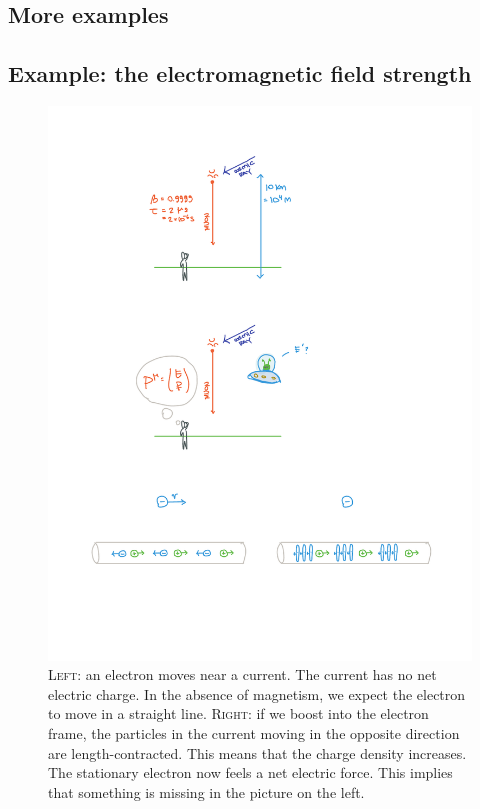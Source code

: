 \documentclass[12pt, oneside]{report}    %
\let\oldsection\section
\def\section{%
  \setcounter{sidenote}{1}%
  \oldsection
}
\begin{document}
\begin{subappendices}
\section{More examples}



\subsection{Example: the electromagnetic field strength}

\begin{figure}[tb]
    \centering
    \includegraphics[width=\textwidth]{figures/EMcurrent.pdf}
    \caption{\textsc{Left}: an electron moves near a current. The current has no net electric charge. In the absence of magnetism, we expect the electron to move in a straight line. \textsc{Right}: if we boost into the electron frame, the particles in the current moving in the opposite direction are length-contracted. This means that the charge density increases. The stationary electron now feels a net electric force. This implies that something is missing in the picture on the left.}
    \label{fig:current}
\end{figure}


\end{subappendices}
\end{document}
